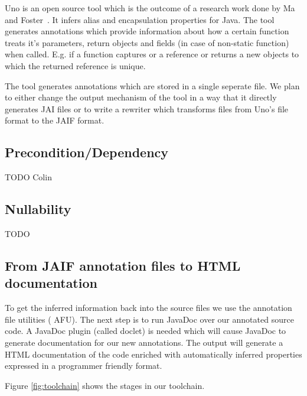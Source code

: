 Uno is an open source tool which is the outcome of a research work done by
Ma and Foster~\cite{Uno}. It infers alias and encapsulation properties for Java.
The tool generates annotations which provide information about how a certain function
treats it's parameters, return objects and fields (in case of non-static function) 
when called. E.g. if a function captures or a reference or returns a new objects to which
the returned reference is unique.

The tool generates annotations which are stored in a single seperate file. We plan
to either change the output mechanism of the tool in a way that it directly generates
JAI files or to write a rewriter which transforms files from Uno's file format to the
JAIF format.

\subsection{Precondition/Dependency}

TODO Colin

\subsection{Nullability}

TODO 


\subsection{From JAIF annotation files to HTML documentation}

To get the inferred information back into the source files we use the annotation 
file utilities (\cite{AFU} AFU). The next step is to run JavaDoc over our
annotated source code. A JavaDoc plugin (called doclet) is needed which will
cause JavaDoc to generate documentation for our new annotations. The output will
generate a HTML documentation of the code enriched with automatically inferred
properties expressed in a programmer friendly format.

Figure \ref{fig:toolchain} shows the stages in our toolchain.
